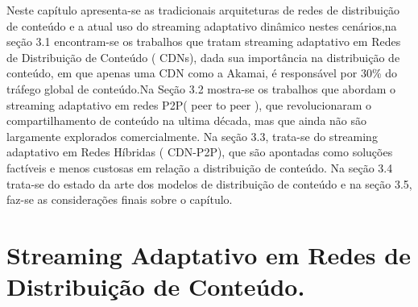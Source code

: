 \documentclass[
	12pt,				%
	oneside,			%
	a4paper,			%
	english,			%
	brazil				%
	]{abntex2ppgsi}
\begin{document}
Neste capítulo apresenta-se as tradicionais arquiteturas de redes de distribuição de conteúdo e a atual uso do streaming adaptativo dinâmico nestes cenários,na seção 3.1 encontram-se os trabalhos que tratam streaming adaptativo em Redes de Distribuição de Conteúdo ( CDNs), dada sua importância na distribuição de conteúdo, em que apenas uma CDN como a Akamai, é responsável por 30\% do tráfego global de conteúdo.Na Seção 3.2 mostra-se os trabalhos que abordam o streaming adaptativo em redes P2P( peer to peer ), que revolucionaram o compartilhamento de conteúdo na ultima década, mas que ainda não são largamente explorados comercialmente. Na seção 3.3, trata-se do streaming adaptativo em Redes Híbridas ( CDN-P2P), que são apontadas como soluções factíveis e menos custosas em relação a distribuição de conteúdo. Na seção 3.4 trata-se do estado da arte dos modelos de distribuição de conteúdo e na seção 3.5, faz-se as considerações finais sobre o capítulo.




\section{Streaming Adaptativo em Redes de Distribuição de Conteúdo.}

\end{document}
